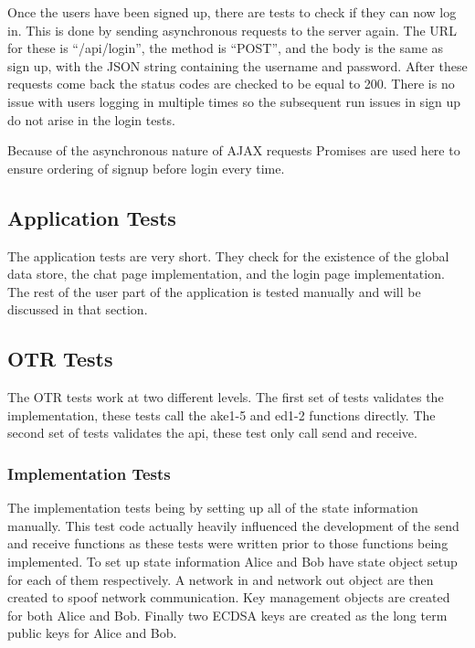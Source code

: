 Once the users have been signed up, there are tests to check if they can now log in. This is done by sending asynchronous requests to the server again. The URL for these is “/api/login”, the method is “POST”, and the body is the same as sign up, with the JSON string containing the username and password. After these requests come back the status codes are checked to be equal to 200. There is no issue with users logging in multiple times so the subsequent run issues in sign up do not arise in the login tests.


Because of the asynchronous nature of AJAX requests Promises are used here to ensure ordering of signup before login every time.


\subsection{Application Tests}


The application tests are very short. They check for the existence of the global data store, the chat page implementation, and the login page implementation. The rest of the user part of the application is tested manually and will be discussed in that section.


\subsection{OTR Tests}


The OTR tests work at two different levels. The first set of tests validates the implementation, these tests call the ake1-5 and ed1-2 functions directly. The second set of tests validates the api, these test only call send and receive.


\subsubsection{Implementation Tests}


The implementation tests being by setting up all of the state information manually. This test code actually heavily influenced the development of the send and receive functions as these tests were written prior to those functions being implemented. To set up state information Alice and Bob have state object setup for each of them respectively. A network in and network out object are then created to spoof network communication. Key management objects are created for both Alice and Bob. Finally two ECDSA keys are created as the long term public keys for Alice and Bob.


